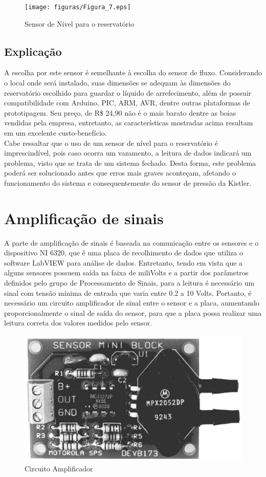 \begin{figure}[!htb]                   
	\centering                          
	\texttt{[image: figuras/Figura\_7.eps]}
	\caption{Sensor de Nível para o reservatório}               
\end{figure}
\subsection{Explicação}
A escolha por este sensor é semelhante à escolha do sensor de fluxo. Considerando o local onde será instalado, suas dimensões se adequam às dimensões do reservatório escolhido para guardar o líquido de arrefecimento, além de possuir compatibilidade com Arduino, PIC, ARM, AVR, dentre outras plataformas de prototipagem. Seu preço, de R\$ 24,90 não é o mais barato dentre as boias vendidas pela empresa, entretanto, as características mostradas acima resultam em um excelente custo-benefício.\\
Cabe ressaltar que o uso de um sensor de nível para o reservatório é imprescindível, pois caso ocorra um vazamento, a leitura de dados indicará um problema, visto que se trata de um sistema fechado. Desta forma, este problema poderá ser solucionado antes que erros mais graves aconteçam, afetando o funcionamento do sistema e consequentemente do sensor de pressão da Kistler.\\
\section{Amplificação de sinais}
A parte de amplificação de sinais é baseada na comunicação entre os sensores e o dispositivo NI 6320, que é uma placa de recolhimento de dados que utiliza o software LabVIEW para análise de dados. Entretanto, tendo em vista que a alguns sensores possuem saída na faixa de miliVolts e a partir dos parâmetros definidos pelo grupo de Processamento de Sinais, para a leitura é necessário um sinal com tensão mínima de entrada que varia entre 0.2 a 10 Volts. Portanto, é necessário um circuito amplificador de sinal entre o sensor e a placa, aumentando proporcionalmente o sinal de saída do sensor, para que a placa possa realizar uma leitura correta dos valores medidos pelo sensor.
\begin{figure}[!htb]                   
	\centering                          
	\includegraphics[scale=0.3]{figuras/Figura_8.eps}
	\caption{Circuito Amplificador}               
\end{figure}
